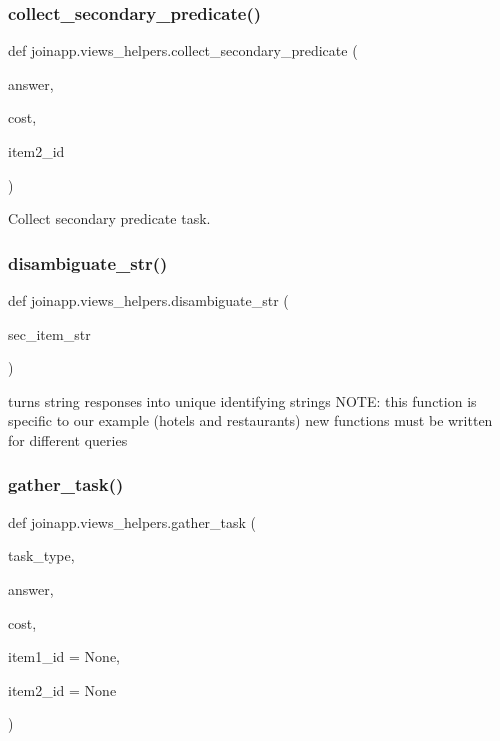 \subsubsection{\texorpdfstring{collect\_secondary\_predicate()}{collect\_secondary\_predicate()}}
{\footnotesize\ttfamily def joinapp.\+views\+\_\+helpers.\+collect\+\_\+secondary\+\_\+predicate (\begin{DoxyParamCaption}\item[{}]{answer,  }\item[{}]{cost,  }\item[{}]{item2\+\_\+id }\end{DoxyParamCaption})}



Collect secondary predicate task. 

\mbox{\label{namespacejoinapp_1_1views__helpers_ad080b70a78f91b79b90bbec5e960142d}} 
\subsubsection{\texorpdfstring{disambiguate\_str()}{disambiguate\_str()}}
{\footnotesize\ttfamily def joinapp.\+views\+\_\+helpers.\+disambiguate\+\_\+str (\begin{DoxyParamCaption}\item[{}]{sec\+\_\+item\+\_\+str }\end{DoxyParamCaption})}



turns string responses into unique identifying strings N\+O\+TE\+: this function is specific to our example (hotels and restaurants) new functions must be written for different queries 

\mbox{\label{namespacejoinapp_1_1views__helpers_af657777675d99bfe303a5ce3c1409144}} 
\subsubsection{\texorpdfstring{gather\_task()}{gather\_task()}}
{\footnotesize\ttfamily def joinapp.\+views\+\_\+helpers.\+gather\+\_\+task (\begin{DoxyParamCaption}\item[{}]{task\+\_\+type,  }\item[{}]{answer,  }\item[{}]{cost,  }\item[{}]{item1\+\_\+id = {\ttfamily None},  }\item[{}]{item2\+\_\+id = {\ttfamily None} }\end{DoxyParamCaption})}



